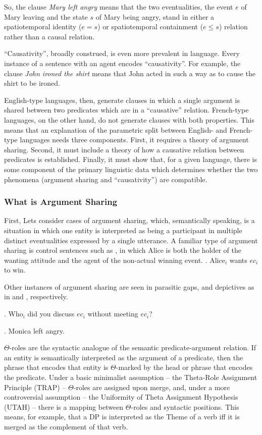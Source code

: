 \documentclass[letterpaper,12pt]{article}
\begin{document}
So, the clause \textit{Mary left angry} means that the two eventualities, the event $e$ of Mary leaving and the state $s$ of Mary being angry, stand in either a spatiotemporal identity ($e=s$) or spatiotemporal containment ($e\leq s$) relation rather than a causal relation.

``Causativity'', broadly construed, is even more prevalent in language.
Every instance of a sentence with an agent encodes ``causativity''.
For example, the clause \textit{John ironed the shirt} means that John acted in such a way as to cause the shirt to be ironed.

English-type languages, then, generate clauses in which a single argument is shared between two predicates which are in a ``causative'' relation.
French-type languages, on the other hand, do not generate clauses with both properties.
This means that an explanation of the parametric split between English- and French-type languages needs three components.
First, it requires a theory of argument sharing.
Second, it must include a theory of how a causative relation between predicates is established.
Finally, it must show that, for a given language, there is some component of the primary linguistic data which determines whether the two phenomena (argument sharing and ``causativity'') are compatible.

\subsubsection{What is Argument Sharing}
First, Lets consider cases of argument sharing, which, semantically speaking, is a situation in which one entity is interpreted as being a participant in multiple distinct eventualities expressed by a single utterance.
A familiar type of argument sharing is control sentences such as \Next, in which Alice is both the holder of the wanting attitude and the agent of the non-actual winning event.
\ex.\label{ex:Control} Alice$_i$ wants $ec_i$ to win.

Other instances of argument sharing are seen in parasitic gaps, and depictives as in \Next and \NNext, respectively.

\ex. Who$_i$ did you discuss $ec_i$ without meeting $ec_i$?

\ex. Monica left angry.

$\Theta$-roles are the syntactic analogue of the semantic predicate-argument relation.
If an entity is semantically interpreted as the argument of a predicate, then the phrase that encodes that entity is $\Theta$-marked by the head or phrase that encodes the predicate.
Under a basic minimalist assumption -- the Theta-Role Assignment Principle (TRAP) \parencite{hornsteinetal2005understanding} -- $\Theta$-roles are assigned upon merge, and, under a more controversial assumption -- the Uniformity of Theta Assignment Hypothesis (UTAH) \parencite{baker1988incorporation}-- there is a mapping between $\Theta$-roles and syntactic positions.
This means, for example, that a DP is interpreted as the Theme of a verb iff it is merged as the complement of that verb.
\end{document}
